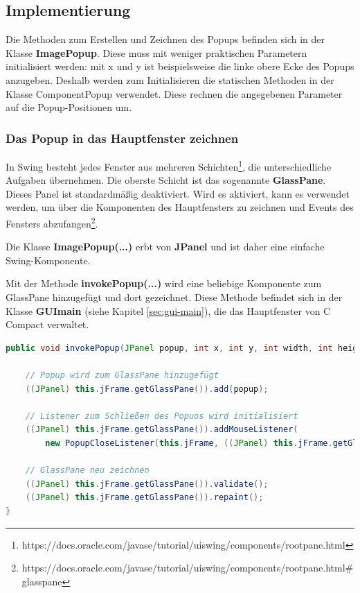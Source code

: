 \subsection{Implementierung}
Die Methoden zum Erstellen und Zeichnen des Popups befinden sich in der Klasse \textbf{ImagePopup}. Diese muss mit weniger praktischen Parametern initialisiert werden: mit x und y ist beispielsweise die linke obere Ecke des Popups anzugeben. Deshalb werden zum Initialisieren die statischen Methoden in der Klasse ComponentPopup verwendet. Diese rechnen die angegebenen Parameter auf die Popup-Positionen um.

\subsubsection*{Das Popup in das Hauptfenster zeichnen}
In Swing besteht jedes Fenster aus mehreren Schichten\footnote{https://docs.oracle.com/javase/tutorial/uiswing/components/rootpane.html}, die unterschiedliche Aufgaben übernehmen. Die oberste Schicht ist das sogenannte \textbf{GlassPane}. Dieses Panel ist standardmäßig deaktiviert. Wird es aktiviert, kann es verwendet werden, um über die Komponenten des Hauptfensters zu zeichnen und Events des Fensters abzufangen\footnote{https://docs.oracle.com/javase/tutorial/uiswing/components/rootpane.html\#glasspane}.

Die Klasse \textbf{ImagePopup(...)} erbt von \textbf{JPanel} und ist daher eine einfache Swing-Komponente. 

Mit der Methode \textbf{invokePopup(...)} wird eine beliebige Komponente zum GlassPane hinzugefügt und dort gezeichnet. Diese Methode befindet sich in der Klasse \textbf{GUImain} (siehe Kapitel \ref{sec:gui-main}), die das Hauptfenster von C Compact verwaltet.
\begin{lstlisting}[language=JAVA]
public void invokePopup(JPanel popup, int x, int y, int width, int height) {

	// Popup wird zum GlassPane hinzugefügt
	((JPanel) this.jFrame.getGlassPane()).add(popup);
	
	// Listener zum Schließen des Popuos wird initialisiert
	((JPanel) this.jFrame.getGlassPane()).addMouseListener(
		new PopupCloseListener(this.jFrame, ((JPanel) this.jFrame.getGlassPane()), popup, x, y, width, height));
		
	// GlassPane neu zeichnen
	((JPanel) this.jFrame.getGlassPane()).validate();
	((JPanel) this.jFrame.getGlassPane()).repaint();
}
\end{lstlisting}

